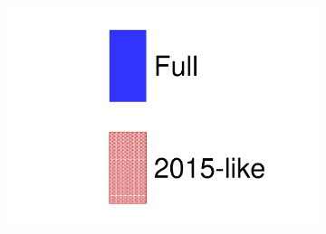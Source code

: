 \begin{figure}[h]
\begin{subfigure}[t]{0.32\textwidth}
		\includegraphics[width=\textwidth, trim={0mm 0mm 0mm 0mm}, clip, page=3]{figures/mach3/data/alt/try_2017_fit_on_sk_spectra_posterior_sk_error_2015like_spectra}
	\end{subfigure}
	

\end{figure}

